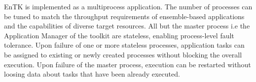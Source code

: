 EnTK is implemented as a multiprocess application. The number of processes
can be tuned to match the throughput requirements of ensemble-based
applications and the capabilities of diverse target resources. All but the
master process i.e  the Application Manager of the toolkit are stateless, 
enabling process-level fault tolerance. Upon failure of one or more stateless 
processes, application tasks can be assigned to existing or newly created 
processes without blocking the overall execution. Upon failure of the master 
process, execution can be restarted without loosing data about tasks that have 
been already executed.

